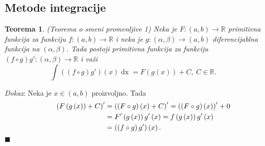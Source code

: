 \documentclass{article}
\newtheorem{teorema}{Teorema}[section]
\DeclareMathOperator{\dx}{dx}
\begin{document}
\subsection{Metode integracije}

\begin{teoremabox}
    \label{teorema_1.2}
    \begin{teorema}
        (Teorema o smeni promenljive 1) Neka je $F: \left(a, b\right) \longrightarrow \mathbb{R}$ primitivna funkcija za funkciju $f:\left(a, b\right) \longrightarrow \mathbb{R}$ i neka je $g: \left(\alpha, \beta\right) \longrightarrow \left(a, b\right)$ diferencijablna funkcija na $\left(\alpha, \beta\right)$. Tada postoji primitivna funkcija za funkciju $\left(f\circ g\right) g' : \left(\alpha, \beta\right) \longrightarrow \mathbb{R}$ i važi
        \begin{equation*}
            \int \left(\left(f\circ g\right) g'\right)\left(x\right)\dx = F\left(g\left(x\right)\right) + C,\ C\in\mathbb{R}.
        \end{equation*}
    \end{teorema}
\end{teoremabox}
\textit{Dokaz}: Neka je $x \in \left(a, b\right)$ proizvoljno. Tada
\begin{align*}
    \hspace*{1cm}    \left(F\left(g\left(x\right)\right) + C\right)' & = \left(\left(F \circ g\right)\left(x\right) + C\right)'  = \left(\left(F \circ g\right)\left(x\right)\right)' + 0 \\
                                                                     & = F'\left(g\left(x\right)\right)  g'\left(x\right)        = f\left(g\left(x\right)\right)  g'\left(x\right)        \\
                                                                     & = \left(\left(f \circ g\right)  g'\right)\left(x\right).
\end{align*}
\null\hfill $\blacksquare$\par
\end{document}
